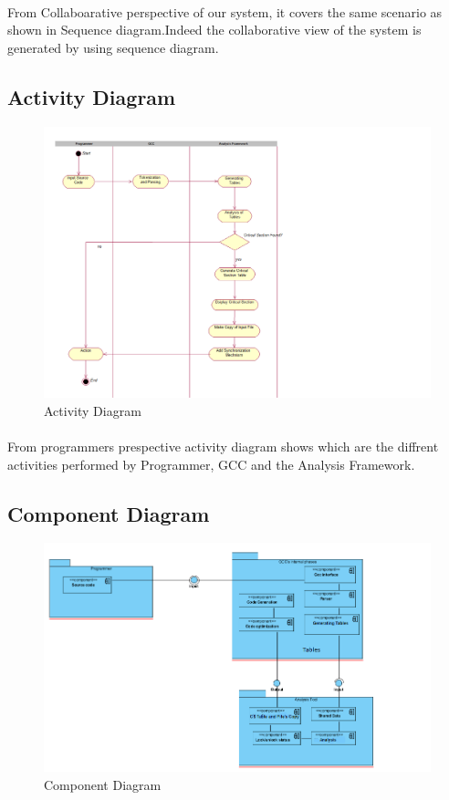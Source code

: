 \paragraph{}
From Collaboarative perspective of our system, it covers the same scenario as shown in Sequence diagram.Indeed the collaborative view of the system is generated by using sequence diagram. 

\subsection{Activity Diagram}
\begin{figure}[H]
\centering
\includegraphics[scale=0.6]{activity.png}
\caption{Activity Diagram}
\label{<<Label>>}
\end{figure}
\paragraph{}
From programmers prespective activity diagram shows which are the diffrent activities performed by Programmer, GCC and the Analysis Framework.

\subsection{Component Diagram}
\begin{figure}[H]
\centering
\includegraphics[scale=0.6]{component.png}
\caption{Component Diagram}
\label{<<Label>>}
\end{figure}
